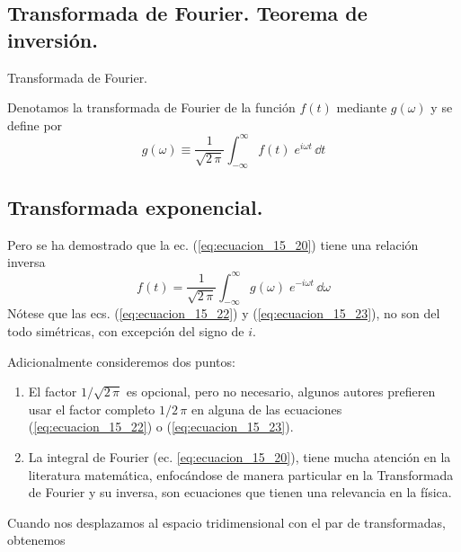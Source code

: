 \subsection{Transformada de Fourier. Teorema de inversión.}
\begin{defi}{Transformada de Fourier.}

Denotamos la transformada de Fourier de la función $f(t)$ mediante $g(\omega)$ y se define por
\begin{equation}
g (\omega) \equiv \dfrac{1}{\sqrt{2 \, \pi}} \int_{-\infty}^{\infty} f(t) \; e^{i \omega t} \, \dd t
\label{eq:ecuacion_15_22}
\end{equation}
\end{defi}
\subsection*{Transformada exponencial.}
Pero se ha demostrado que la ec. (\ref{eq:ecuacion_15_20}) tiene una relación inversa 
\begin{equation}
f(t) = \dfrac{1}{\sqrt{2 \, \pi}} \int_{-\infty}^{\infty} g(\omega) \; e^{-i \omega t} \, \dd \omega
\label{eq:ecuacion_15_23}
\end{equation}
Nótese que las ecs. (\ref{eq:ecuacion_15_22}) y (\ref{eq:ecuacion_15_23}), no son del todo simétricas, con excepción del signo de $i$.
\par
Adicionalmente consideremos dos puntos: 
\begin{enumerate}
\item  El factor $1/\sqrt{2 \, \pi}$ es opcional, pero no necesario, algunos autores prefieren usar el factor completo $1/2 \, \pi$ en alguna de las ecuaciones (\ref{eq:ecuacion_15_22}) o (\ref{eq:ecuacion_15_23}).
\item La integral de Fourier (ec. \ref{eq:ecuacion_15_20}), tiene mucha atención en la literatura matemática, enfocándose de manera particular en la Transformada de Fourier y su inversa, son ecuaciones que tienen una relevancia en la física.
\end{enumerate}
Cuando nos desplazamos al espacio tridimensional con el par de transformadas, obtenemos
